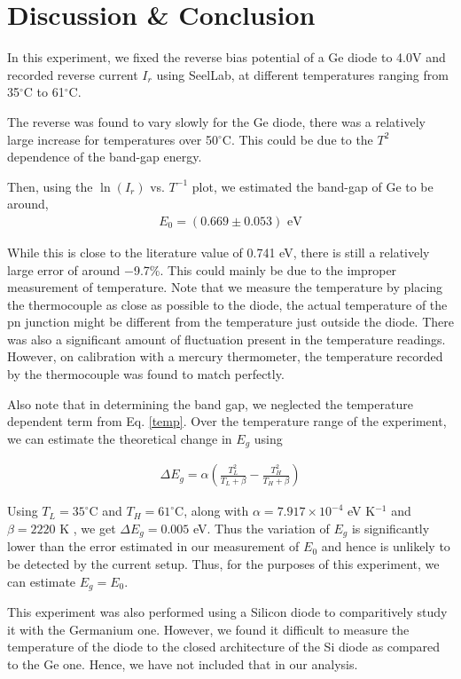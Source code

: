 \section{Discussion \& Conclusion}
In this experiment, we fixed the reverse bias potential of a Ge diode to 4.0V and recorded reverse current $I_r$ using SeelLab, at different temperatures ranging from 35$^\circ$C to 61$^\circ$C. 

The reverse was found to vary slowly for the Ge diode, there was a relatively large increase for temperatures over 50$^\circ$C. This could be due to the $T^2$ dependence of the band-gap energy.

Then, using the $\ln(I_r)$ vs. $T^{-1}$ plot, we estimated the band-gap of Ge to be around,
\begin{align*}
    \boxed{E_0 = (0.669 \pm 0.053) \text{ eV}}
\end{align*}

While this is close to the literature value of 0.741 eV, there is still a relatively large error of around $-$9.7\%. 
This could mainly be due to the improper measurement of temperature. Note that we measure the temperature by placing the thermocouple as close as possible to the diode, the actual temperature of the pn junction might be different from the temperature just outside the diode. There was also a significant amount of fluctuation present in the temperature readings.
However, on calibration with a mercury thermometer, the temperature recorded by the thermocouple was found to match perfectly.

Also note that in determining the band gap, we neglected the temperature dependent term from Eq. \ref{temp}. Over the temperature range of the experiment, we can estimate the theoretical change in $E_g$ using

\begin{align}
    \Delta E_g = \alpha \left(\frac{T_L^2}{T_L + \beta} - \frac{T_H^2}{T_H + \beta}\right)
\end{align}

Using $T_L = 35^\circ$C and $T_H = 61^\circ$C, along with $\alpha=7.917\times 10^{-4}$ eV K$^{-1}$ and $\beta=2220$ K \cite{varshni-1967}, we get $\Delta E_g = 0.005$ eV. Thus the variation of $E_g$ is significantly lower than the error estimated in our measurement of $E_0$ and hence is unlikely to be detected by the current setup. Thus, for the purposes of this experiment, we can estimate $E_g = E_0$.

This experiment was also performed using a Silicon diode to comparitively study it with the Germanium one. However, we found it difficult to measure the temperature of the diode to the closed architecture of the Si diode as compared to the Ge one. Hence, we have not included that in our analysis.

